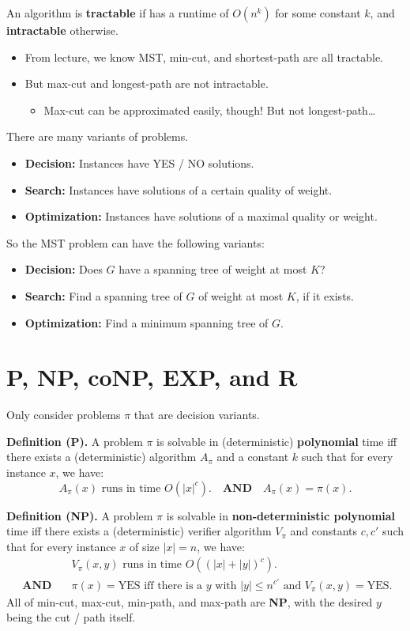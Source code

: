 An algorithm is \textbf{tractable} if has a runtime of $O(n^k)$ for some constant $k$, and \textbf{intractable} otherwise.
\begin{itemize}
    \item From lecture, we know MST, min-cut, and shortest-path are all tractable.
    \item But max-cut and longest-path are not intractable.
    \begin{itemize}
        \item Max-cut can be approximated easily, though!  But not longest-path\dots
    \end{itemize}
\end{itemize}
There are many variants of problems.
\begin{itemize}
    \item \textbf{Decision:} Instances have YES / NO solutions.
    \item \textbf{Search:} Instances have solutions of a certain quality of weight.
    \item \textbf{Optimization:} Instances have solutions of a maximal quality or weight.
\end{itemize}
So the MST problem can have the following variants:
\begin{itemize}
    \item \textbf{Decision:} Does $G$ have a spanning tree of weight at most $K$?
    \item \textbf{Search:} Find a spanning tree of $G$ of weight at most $K$, if it exists.
    \item \textbf{Optimization:} Find a minimum spanning tree of $G$.
\end{itemize}

\section{P, NP, coNP, EXP, and R}

Only consider problems $\pi$ that are decision variants.

\textbf{Definition (P).} A problem $\pi$ is solvable in (deterministic) \textbf{polynomial} time iff there exists a (deterministic) algorithm $A_{\pi}$ and a constant $k$ such that for every instance $x$, we have:
\[ A_{\pi}(x) \text{ runs in time } O(|x|^c). ~~~ \textbf{ AND } ~~~ A_{\pi}(x) = \pi(x). \]

\textbf{Definition (NP).} A problem $\pi$ is solvable in \textbf{non-deterministic polynomial} time iff there exists a (deterministic) verifier algorithm $V_{\pi}$ and constants $c, c'$ such that for every instance $x$ of size $|x| = n$, we have:
\begin{align*}
& V_{\pi}(x, y) \text{ runs in time } O((|x| + |y|)^c). \\
\textbf{ AND } ~~~ & \pi(x) = \text{YES} \text{ iff there is a } y \text{ with } |y| \leq n^{c'} \text{ and } V_{\pi}(x, y) = \text{YES}. \end{align*}
All of min-cut, max-cut, min-path, and max-path are \textbf{NP}, with the desired $y$ being the cut / path itself.

